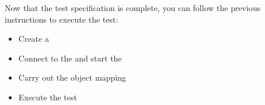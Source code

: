 Now that the test specification is complete, you can follow the previous instructions to execute the test:
\begin{itemize}
\item Create a \gdsuite{} 
\item Connect to the \gdagent{} and start the \gdaut{} 
\item Carry out the object mapping 
\item Execute the test 
\end{itemize}
